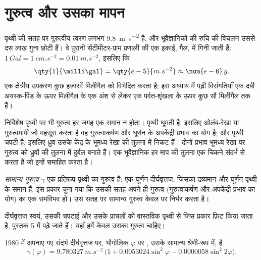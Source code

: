 \section{गुरुत्व और उसका मापन}

पृथ्वी की सतह पर गुरुत्वीय त्वरण लगभग \qty{9.8}{m.s^{-2}} है, और भूवैज्ञानिकों की रुचि की विचलन उससे दस लाख गुना छोटी हैं। वे पुरानी सेंटीमीटर-ग्राम प्रणाली की एक इकाई, गैल, में गिनी जाती हैं: $\qty{1}{Gal} = \qty{1}{cm.s^{-2}} = \qty{0.01}{m.s^{-2}}$, इसलिए कि
\[
  \qty{1}{\milli\gal} = \qty{e-5}{m.s^{-2}} \approx \num{e-6}\,g .
\]
एक क्षेत्रीय उपकरण कुछ हज़ारवें मिलीगैल को विभेदित करता है; इस अध्याय में पढ़ी विसंगतियाँ एक दबी अयस्क-पिंड के ऊपर मिलीगैल के एक अंश से लेकर एक पर्वत-शृंखला के ऊपर कुछ सौ मिलीगैल तक हैं।

निर्विशेष पृथ्वी पर भी गुरुत्व हर जगह एक समान न होता। पृथ्वी घूमती है, इसलिए ओलंब-रेखा या गुरुत्वमापी जो महसूस करता है वह गुरुत्वाकर्षण और घूर्णन के अपकेंद्री प्रभाव का योग है; और पृथ्वी चपटी है, इसलिए ध्रुव उसके केंद्र के भूमध्य रेखा की तुलना में निकट हैं। दोनों प्रभाव भूमध्य रेखा पर गुरुत्व को ध्रुवों की तुलना में दुर्बल बनाते हैं। एक भूवैज्ञानिक हर माप की तुलना एक चिकने संदर्भ से करता है जो इन्हें समाहित करता है।

\begin{definition}[सामान्य गुरुत्व]\label{def:b1:isostasy-gravity:normal-gravity}
\emph{सामान्य गुरुत्व} $\gamma$ एक प्रतिरूप पृथ्वी का गुरुत्व है: एक घूर्णन-दीर्घवृत्तज, जिसका द्रव्यमान और घूर्णन पृथ्वी के समान हैं, इस प्रकार चुना गया कि उसकी सतह अपने ही गुरुत्व (गुरुत्वाकर्षण और अपकेंद्री प्रभाव का योग) का एक समविभव हो। उस सतह पर सामान्य गुरुत्व केवल  पर निर्भर करता है।
\end{definition}

दीर्घवृत्तज स्वयं, उसकी चपटाई और उसके प्राचलों को वास्तविक पृथ्वी से जिस प्रकार फ़िट किया जाता है, पुस्तक 5 में पढ़े जाते हैं। यहाँ हमें केवल उसका गुरुत्व चाहिए।

\begin{proposition}[सामान्य गुरुत्व का सूत्र]\label{prop:b1:isostasy-gravity:normal-formula}
1980 में अपनाए गए संदर्भ दीर्घवृत्तज पर, भौगोलिक  $\varphi$ पर , उसके सामान्य श्रेणी-रूप में, है
\[
  \gamma(\varphi) = \qty{9.780327}{m.s^{-2}}\,\bigl(1 + 0.0053024\sin^2\varphi
  - 0.0000058\sin^2 2\varphi\bigr).
\]
\end{proposition}
\admitted

